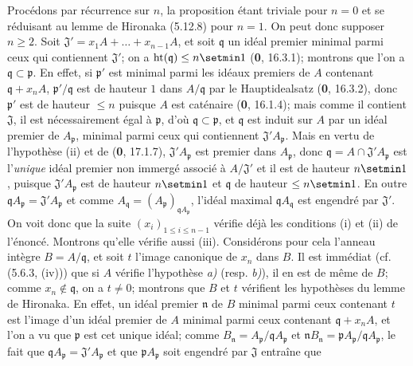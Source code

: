Procédons par récurrence sur $n$, la proposition étant triviale pour $n=0$ et
se réduisant au lemme de Hironaka (5.12.8) pour $n=1$. On peut donc supposer
$n\geq2$. Soit $\mathfrak J'=x_1A+\ldots+x_{n-1}A$, et soit $\mathfrak q$ un
idéal premier minimal parmi ceux qui contiennent $\mathfrak J'$; on a
$\operatorname{ht}(\mathfrak q)\leq n\setmin 1$ (\textbf{0}, 16.3.1); montrons que l'on a
$\mathfrak q\subset\mathfrak p$. En effet, si $\mathfrak p'$ est minimal parmi
les idéaux premiers de $A$ contenant $\mathfrak q+x_nA$,
$\mathfrak p'/\mathfrak q$ est de hauteur $1$ dans $A/\mathfrak q$ par le
Hauptidealsatz (\textbf{0}, 16.3.2), donc $\mathfrak p'$ est de hauteur $\leq n$ puisque
$A$ est caténaire (\textbf{0}, 16.1.4); mais comme il contient $\mathfrak J$, il est
nécessairement égal à $\mathfrak p$, d'où
$\mathfrak q\subset\mathfrak p$,
et $\mathfrak q$ est induit sur $A$ par un idéal premier de
$A_{\mathfrak p}$, minimal parmi ceux qui contiennent
$\mathfrak J'A_{\mathfrak p}$. Mais en vertu de l'hypothèse (ii) et de (\textbf{0},
17.1.7), $\mathfrak J'A_{\mathfrak p}$ est premier dans $A_{\mathfrak p}$,
donc
$\mathfrak q=A\cap\mathfrak J'A_{\mathfrak p}$
est l'\emph{unique} idéal premier non immergé associé à $A/\mathfrak J'$ et il est de
hauteur $n\setmin 1$, puisque $\mathfrak J'A_{\mathfrak p}$ est de hauteur $n\setmin 1$ et
$\mathfrak q$ de hauteur $\leq n\setmin 1$. En outre
$\mathfrak qA_{\mathfrak p}=\mathfrak J'A_{\mathfrak p}$ et comme
$A_{\mathfrak q}=(A_{\mathfrak p})_{\mathfrak qA_{\mathfrak p}}$, l'idéal
maximal $\mathfrak qA_{\mathfrak q}$ est engendré par $\mathfrak J'$. On voit
donc que la suite $(x_i)_{1\leq i\leq n-1}$ vérifie déjà les conditions (i) et
(ii) de l'énoncé. Montrons qu'elle vérifie aussi (iii). Considérons pour cela
l'anneau intègre $B=A/\mathfrak q$, et soit $t$ l'image canonique de $x_n$ dans
$B$. Il est immédiat (cf. (5.6.3, (iv))) que si $A$ vérifie l'hypothèse \emph{a)}
(resp. \emph{b)}), il en est de même de $B$; comme $x_n\notin\mathfrak q$, on a
$t\neq0$; montrons que $B$ et $t$ vérifient les hypothèses du lemme de
Hironaka. En effet, un idéal premier $\mathfrak n$ de $B$ minimal parmi ceux
contenant $t$ est l'image d'un idéal premier de $A$ minimal parmi ceux
contenant $\mathfrak q+x_nA$, et l'on a vu que $\mathfrak p$ est cet unique
idéal; comme
$B_{\mathfrak n}=A_{\mathfrak p}/\mathfrak qA_{\mathfrak p}$ et
$\mathfrak nB_{\mathfrak n}
=\mathfrak pA_{\mathfrak p}/\mathfrak qA_{\mathfrak p}$,
le fait que $\mathfrak qA_{\mathfrak p}=\mathfrak J'A_{\mathfrak p}$ et que
$\mathfrak pA_{\mathfrak p}$ soit engendré par $\mathfrak J$ entraîne que
